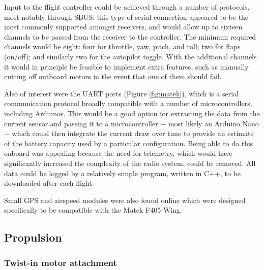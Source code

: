 \documentclass[../../main.tex]{subfiles}
\begin{document}

Input to the flight controller could be achieved through a number of protocols, most notably through SBUS; this type of serial connection appeared to be the most commonly supported amongst receivers, and would allow up to sixteen channels to be passed from the receiver to the controller.
The minimum required channels would be eight: four for throttle, yaw, pitch, and roll; two for flaps (on/off); and similarly two for the autopilot toggle.
With the additional channels it would in principle be feasible to implement extra features, such as manually cutting off outboard motors in the event that one of them should fail. 

Also of interest were the UART ports (Figure \ref{fig:matek}), which is a serial communication protocol broadly compatible with a number of microcontrollers, including Arduinos.
This would be a good option for extracting the data from the current sensor and passing it to a microcontroller $-$ most likely an Arduino Nano $-$ which could then integrate the current draw over time to provide an estimate of the battery capacity used by a particular configuration.
Being able to do this onboard was appealing because the need for telemetry, which would have significantly increased the complexity of the radio system, could be removed.
All data could be logged by a relatively simple program, written in C++, to be downloaded after each flight.

Small GPS and airspeed modules were also found online which were designed specifically to be compatible with the Matek F405-Wing.


\subsection{Propulsion} \label{sec:design-process:preliminary-design:propulsion}

\subsubsection{Twist-in motor attachment} \label{sec:design-process:preliminary-design:propulsion:twist-in-motor-attachment}
\end{document}
